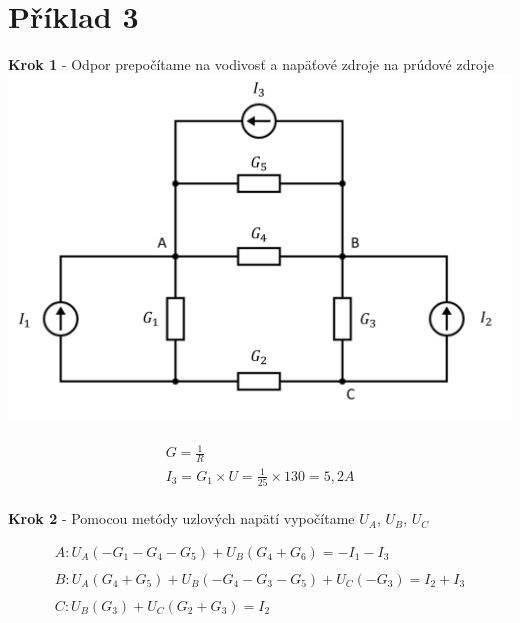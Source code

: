 \section{Příklad 3}

\begin{center}
    \textbf{Krok 1} - Odpor prepočítame na vodivosť a napäťové zdroje na prúdové zdroje
    \includegraphics[scale=0.5,keepaspectratio]{fig/pr3_1.png} \\
\end{center}

\begin{gather*}
    G = \frac {1} {R} \\
    I_3 = G_1 \times U = \frac {1} {25} \times 130 = 5,2 A \\
\end{gather*}

\newpage

\begin{center}
    \textbf{Krok 2} - Pomocou metódy uzlových napätí vypočítame $U_{A}$, $U_{B}$, $U_{C}$ 
\end{center}

\begin{gather*}
   A:  U_A(-G_1 - G_4 - G_5) + U_B(G_4 + G_6) = -I_1 - I_3 \\\\
   B:  U_A(G_4 + G_5) + U_B(-G_4 - G_3 - G_5) + U_C(-G_3) = I_2 + I_3 \\\\
   C:  U_B(G_3) + U_C(G_2 + G_3) = I_2 \\
\end{gather*}

